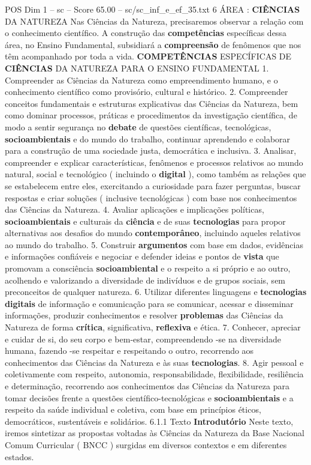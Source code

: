 \begin{textsample}{POS Dim 1 – sc – Score 65.00 – sc/sc\_inf\_e\_ef\_35.txt}  \label{ex:f1_pos_012}
6 ÁREA : \textbf{CIÊNCIAS} DA NATUREZA Nas Ciências da Natureza, precisaremos observar a relação com o conhecimento científico.
A construção das \textbf{competências} específicas dessa área, no Ensino Fundamental, subsidiará a \textbf{compreensão} de fenômenos que nos têm acompanhado por toda a vida. \textbf{COMPETÊNCIAS} ESPECÍFICAS DE \textbf{CIÊNCIAS} DA NATUREZA PARA O ENSINO FUNDAMENTAL 1.
Compreender as Ciências da Natureza como empreendimento humano, e o conhecimento científico como provisório, cultural e histórico. 2.
Compreender conceitos fundamentais e estruturas explicativas das Ciências da Natureza, bem como dominar processos, práticas e procedimentos da investigação científica, de modo a sentir segurança no \textbf{debate} de questões científicas, tecnológicas, \textbf{socioambientais} e do mundo do trabalho, continuar aprendendo e colaborar para a construção de uma sociedade justa, democrática e inclusiva. 3.
Analisar, compreender e explicar características, fenômenos e processos relativos ao mundo natural, social e tecnológico ( incluindo o \textbf{digital} ), como também as relações que se estabelecem entre eles, exercitando a curiosidade para fazer perguntas, buscar respostas e criar soluções ( inclusive tecnológicas ) com base nos conhecimentos das Ciências da Natureza. 4.
Avaliar aplicações e implicações políticas, \textbf{socioambientais} e culturais da \textbf{ciência} e de suas \textbf{tecnologias} para propor alternativas aos desafios do mundo \textbf{contemporâneo}, incluindo aqueles relativos ao mundo do trabalho. 5.
Construir \textbf{argumentos} com base em dados, evidências e informações confiáveis e negociar e defender ideias e pontos de \textbf{vista} que promovam a consciência \textbf{socioambiental} e o respeito a si próprio e ao outro, acolhendo e valorizando a diversidade de indivíduos e de grupos sociais, sem preconceitos de qualquer natureza. 6.
Utilizar diferentes linguagens e \textbf{tecnologias} \textbf{digitais} de informação e comunicação para se comunicar, acessar e disseminar informações, produzir conhecimentos e resolver \textbf{problemas} das Ciências da Natureza de forma \textbf{crítica}, significativa, \textbf{reflexiva} e ética. 7.
Conhecer, apreciar e cuidar de si, do seu corpo e bem-estar, compreendendo -se na diversidade humana, fazendo -se respeitar e respeitando o outro, recorrendo aos conhecimentos das Ciências da Natureza e às suas \textbf{tecnologias}. 8.
Agir pessoal e coletivamente com respeito, autonomia, responsabilidade, flexibilidade, resiliência e determinação, recorrendo aos conhecimentos das Ciências da Natureza para tomar decisões frente a questões científico-tecnológicas e \textbf{socioambientais} e a respeito da saúde individual e coletiva, com base em princípios éticos, democráticos, sustentáveis e solidários. 6.1.1 Texto \textbf{Introdutório} Neste texto, iremos sintetizar as propostas voltadas às Ciências da Natureza da Base Nacional Comum Curricular ( BNCC ) surgidas em diversos contextos e em diferentes estados.

\end{textsample}
